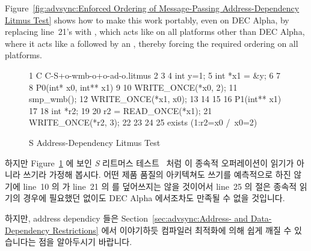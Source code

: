 Figure~\ref{fig:advsync:Enforced Ordering of Message-Passing Address-Dependency Litmus Test}
shows how to make this work portably, even on DEC Alpha, by
replacing line~21's  with ,
which acts like  on all platforms other than DEC Alpha,
where it acts like a  followed by an ,
thereby forcing the required ordering on all platforms.
\fi

\begin{figure}[tbp]
{ \scriptsize
\begin{verbbox}
 1 C C-S+o-wmb-o+o-ad-o.litmus
 2
 3 {
 4 int y=1;
 5 int *x1 = &y;
 6 }
 7
 8 P0(int* x0, int** x1) {
 9
10   WRITE_ONCE(*x0, 2);
11   smp_wmb();
12   WRITE_ONCE(*x1, x0);
13
14 }
15
16 P1(int** x1) {
17
18   int *r2;
19
20   r2 = READ_ONCE(*x1);
21   WRITE_ONCE(*r2, 3);
22
23 }
24
25 exists (1:r2=x0 /\ x0=2)
\end{verbbox}
}
\centering
\theverbbox
\caption{S Address-Dependency Litmus Test}
\label{fig:advsync:S Address-Dependency Litmus Test}
\end{figure}

하지만
Figure~\ref{fig:advsync:S Address-Dependency Litmus Test}
에 보인 \emph{S} 리트머스 테스트~\cite{JadeAlglave2011ppcmem} 처럼
이 종속적 오퍼레이션이 읽기가 아니라 쓰기라 가정해 봅시다.
어떤 제품 품질의 아키텍쳐도 쓰기를 예측적으로 하진 않기에 line~10 의
 가 line~21 의  를 덮어쓰지는 않을 것이어서
line~25 의  절은 종속적 읽기의 경우에 필요했던
 없이도 DEC Alpha 에서조차도 만족될 수 없을
것입니다.

하지만, address dependicy 들은
Section~\ref{sec:advsync:Address- and Data-Dependency Restrictions}
에서 이야기하듯 컴파일러 최적화에 의해 쉽게 깨질 수 있습니다는 점을 알아두시기
바랍니다.

